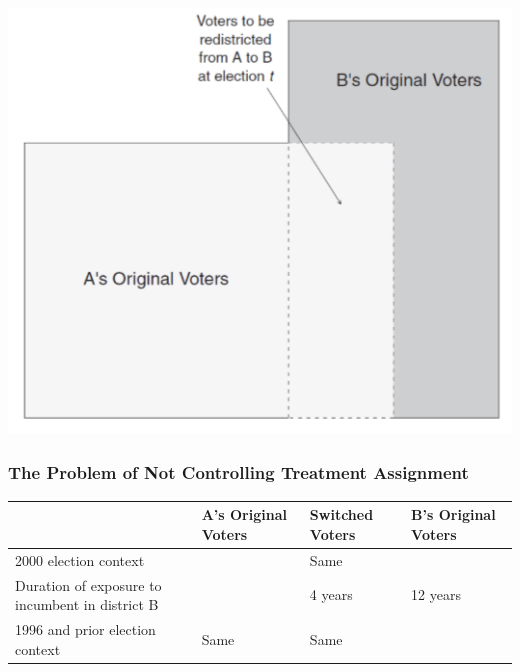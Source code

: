 \documentclass[xcolor=x11names,compress]{beamer}\usepackage[]{graphicx}\usepackage[]{color}
\renewcommand{\(}{\begin{columns}}
\renewcommand{\)}{\end{columns}}
\newcommand{\<}[1]{\begin{column}{#1}}
\renewcommand{\>}{\end{column}}
\begin{document}
\begin{frame}
\includegraphics[scale=0.38]{Sekhon_redistricting_a.png}
\end{frame}

\begin{frame}
\frametitle{The Problem of Not Controlling Treatment Assignment}
\footnotesize
\begin{table}[htbp]
  \centering
    \begin{tabular}{|p{3cm}|p{2.4cm}|p{2.4cm}|p{2.4cm}|}
    \hline
          & \textbf{A's Original Voters} & \textbf{Switched Voters} & \multicolumn{1}{p{2.4cm}}{\textbf{B's Original Voters}} \bigstrut\\
    \hline
    2000 election context &       & \cellcolor[rgb]{ .776,  .878,  .706}Same  & \cellcolor[rgb]{ .776,  .878,  .706}\multicolumn{1}{p{2.4cm}}{Same} \bigstrut\\
    \hline
    Duration of exposure to incumbent in district B &       & 4 years & \multicolumn{1}{p{2.4cm}}{12 years} \bigstrut\\
    \hline
    1996 and prior election context & \cellcolor[rgb]{ .776,  .878,  .706}Same  & \cellcolor[rgb]{ .776,  .878,  .706}Same  &  \bigstrut\\
    \hline
    \end{tabular}%
  \label{tab:addlabel}%
\end{table}
\normalsize
\end{frame}
\end{document}
